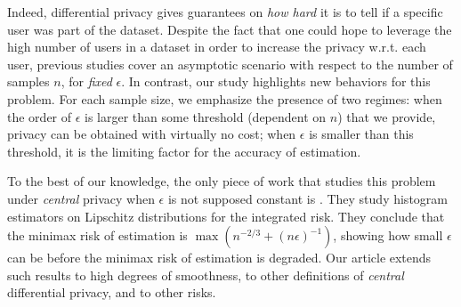 \documentclass[10pt]{article} %
\newcommand\p[1]{\left( {#1}\right)}
\newcommand\RG[1]{\textcolor{red}{#1}}
\newcommand\AG[1]{\textcolor{magenta}{#1}}
\newcommand\B[1]{{#1}}
\begin{document}
\B{Indeed, differential privacy gives guarantees on \emph{how hard} it is to tell if a specific user was part of the dataset. Despite the fact that one could hope to leverage the high number of users in a dataset in order to increase the privacy w.r.t. each user,
previous studies \citep{wasserman2010statistical,hall2013differential} cover an asymptotic scenario with respect to the number of samples $n$, for {\em fixed} $\epsilon$. 
In contrast, our study highlights new behaviors for this problem.
For each sample size, we emphasize the presence of two regimes: when the order of $\epsilon$ is larger than some threshold (dependent on $n$) that we provide, privacy can be obtained with virtually no cost; when $\epsilon$ is smaller than this threshold, it is the limiting factor for the accuracy of estimation.}


To the best of our knowledge, the only piece of work that studies this problem under \emph{\B{central}} privacy when $\epsilon$ is not supposed constant is \citet{barber2014privacy}. They study histogram estimators on Lipschitz distributions for the integrated risk. They conclude that the minimax risk of estimation is $\max \p{n^{-2/3} + (n\epsilon)^{-1}}$, showing how small $\epsilon$ can be before the minimax risk of estimation is degraded. Our article extends such results to high degrees of smoothness, to other definitions of \emph{\B{central}} differential privacy, and to other risks.
\end{document}

